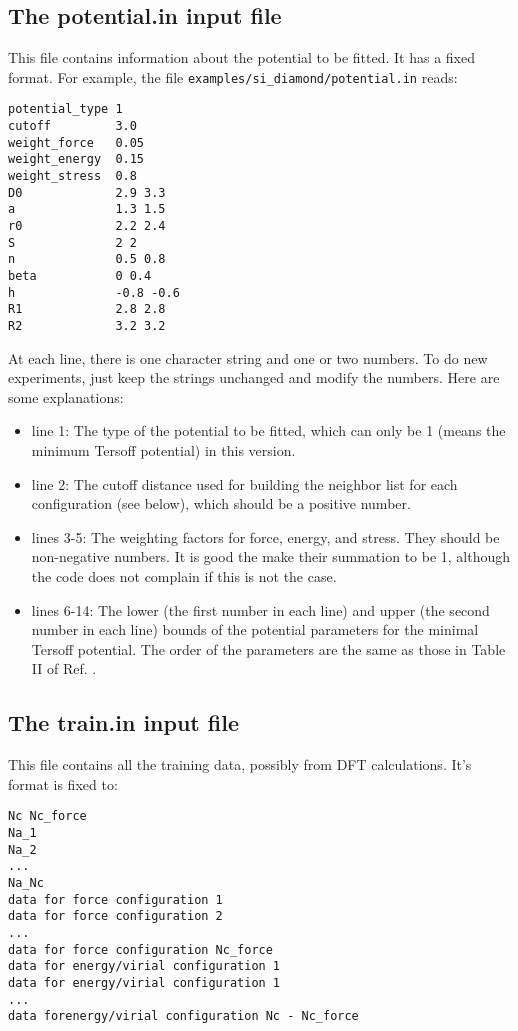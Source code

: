 \documentclass[12pt,a4paper]{report}
\begin{document}
\subsection{The potential.in input file}

This file contains information about the potential to be fitted. It has a fixed format. For example, the file \verb"examples/si_diamond/potential.in" reads:
\begin{verbatim}
potential_type 1
cutoff         3.0
weight_force   0.05
weight_energy  0.15
weight_stress  0.8
D0             2.9 3.3
a              1.3 1.5
r0             2.2 2.4
S              2 2
n              0.5 0.8
beta           0 0.4
h              -0.8 -0.6
R1             2.8 2.8
R2             3.2 3.2
\end{verbatim}
At each line, there is one character string and one or two numbers. To do new experiments, just keep the strings unchanged and modify the numbers. Here are some explanations:
\begin{itemize}
\item line 1: The type of the potential to be fitted, which can only be 1  (means the minimum Tersoff potential) in this version.
\item line 2: The cutoff distance used for building the neighbor list for each configuration (see below), which should be a positive number.
\item lines 3-5: The weighting factors for force, energy, and stress. They should be non-negative numbers. It is good the make their summation to be 1, although the code does not complain if this is not the case.
\item lines 6-14: The lower (the first number in each line) and upper (the second number in each line) bounds of the potential parameters for the minimal Tersoff potential. The order of the parameters are the same as those in Table II of Ref. \cite{fan2019arxiv}.
\end{itemize}


\subsection{The train.in input file}

This file contains all the training data, possibly from DFT calculations. It's format is fixed to:
\begin{verbatim}
Nc Nc_force
Na_1
Na_2
...
Na_Nc
data for force configuration 1
data for force configuration 2
...
data for force configuration Nc_force
data for energy/virial configuration 1
data for energy/virial configuration 1
...
data forenergy/virial configuration Nc - Nc_force
\end{verbatim}
\end{document}
